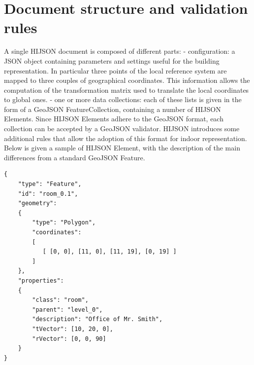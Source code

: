 \documentclass{sig-alternate}
\begin{document}
\section{Document structure and validation rules}\label{document-structure-and-validation-rules}

A single HIJSON document is composed of different parts: - configuration: a JSON object containing parameters and settings useful for the building representation. In particular three points of the local reference system are mapped to three couples of geographical coordinates. This information allows the computation of the transformation matrix used to translate the local coordinates to global ones. - one or more data collections: each of these lists is given in the form of a GeoJSON FeatureCollection, containing a number of HIJSON Elements. Since HIJSON Elements adhere to the GeoJSON format, each collection can be accepted by a GeoJSON validator. HIJSON introduces some additional rules that allow the adoption of this format for indoor representation. Below is given a sample of HIJSON Element, with the description of the main differences from a standard GeoJSON Feature.

\begin{verbatim}
{
    "type": "Feature",
    "id": "room_0.1",
    "geometry": 
    {
        "type": "Polygon",
        "coordinates": 
        [ 
           [ [0, 0], [11, 0], [11, 19], [0, 19] ]
        ]    
    },
    "properties": 
    {
        "class": "room",
        "parent": "level_0",
        "description": "Office of Mr. Smith",
        "tVector": [10, 20, 0],
        "rVector": [0, 0, 90]
    }
}
\end{verbatim}
\end{document}
